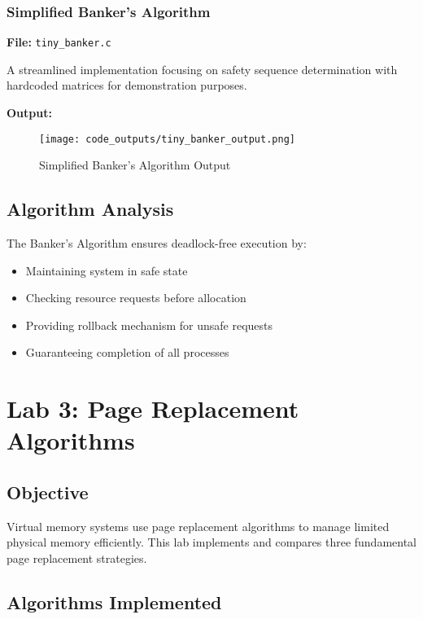 \documentclass[12pt,a4paper]{article}
\begin{document}
\vspace{3cm}

\subsubsection{Simplified Banker's Algorithm}
\textbf{File:} \texttt{tiny\_banker.c}

A streamlined implementation focusing on safety sequence determination with hardcoded matrices for demonstration purposes.

\textbf{Output:}
\begin{figure}[H]
    \centering
    \texttt{[image: code\_outputs/tiny\_banker\_output.png]}
    \caption{Simplified Banker's Algorithm Output}
    \label{fig:tiny_banker_output}
\end{figure}

\vspace{2cm}

\subsection{Algorithm Analysis}
The Banker's Algorithm ensures deadlock-free execution by:
\begin{itemize}
    \item Maintaining system in safe state
    \item Checking resource requests before allocation
    \item Providing rollback mechanism for unsafe requests
    \item Guaranteeing completion of all processes
\end{itemize}

\section{Lab 3: Page Replacement Algorithms}

\subsection{Objective}
Virtual memory systems use page replacement algorithms to manage limited physical memory efficiently. This lab implements and compares three fundamental page replacement strategies.

\subsection{Algorithms Implemented}
\end{document}
